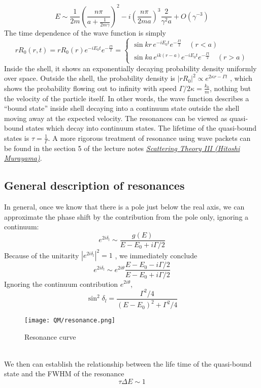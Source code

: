 \documentclass[cyan]{elegantnote}
\begin{document}
\[E \sim \frac{1}{2m} \left( \frac{n\pi}{a + \frac{1}{2m\gamma}}\right)^2 - i \left( \frac{n\pi}{2ma}\right)^3 \frac{2}{\gamma^2 a} + O(\gamma^{-3})\]
The time dependence of the wave function is simply
\[rR_0(r,t) = rR_0(r) e^{-iE_0t} e^{-\frac{\Gamma t}{2}} = \begin{cases} \sin kr \, e^{-iE_0t} e^{-\frac{\Gamma t}{2}} \quad (r<a) \\\sin ka \,  e^{ik(r-a)} e^{-iE_0t} e^{-\frac{\Gamma t}{2}} \quad (r > a) \end{cases}\]
Inside the shell, it shows an exponentially decaying probability density uniformly over space.
Outside the shell, the probability density is $|rR_0|^2 \propto e^{2\kappa r-\Gamma t}$ , which shows the probability flowing out to infinity with speed $\Gamma/2\kappa = \frac{k_0}{m}$,
nothing but the velocity of the particle itself. In other words, the wave function describes a ``bound state'' inside shell decaying into a continuum state outside the shell moving away at the expected velocity. The resonances can be viewed as
quasi-bound states which decay into continuum states. The lifetime of the quasi-bound states is $\tau = \frac{1}{\Gamma}$.
A more rigorous treatment of resonance using wave packets can be found in the section 5 of the lecture notes 
\href{http://hitoshi.berkeley.edu/221B/index.html}{\emph{Scattering Theory III (Hitoshi Murayama)}}.

\subsection{General description of resonances}
In general, once we know that there is a pole just below the real axis, we can approximate the phase shift by the contribution from the pole only, ignoring a continuum:
\[e^{2i\delta_l} \sim \frac{g(E)}{E-E_0 + i\Gamma/2}\]
Because of the unitarity $|e^{2i\delta_l}|^2 = 1$ , we immediately conclude
\[ e^{2i\delta_l} \sim e^{2i\theta}\frac{E-E_0-i\Gamma/2}{E-E_0 + i\Gamma/2} \]
Ignoring the continuum contribution $e^{2i\theta}$,
\[\sin^2 \delta_l = \frac{\Gamma^2/4}{(E-E_0)^2+\Gamma^2/4}\]
\begin{figure}[!h]
	\centering
	\texttt{[image: QM/resonance.png]}
	\caption{Resonance curve}
\end{figure}\\
We then can establish the relationship between the life time of the quasi-bound state and the FWHM of the resonance
\[\tau \Delta E \sim 1\]
\end{document}
